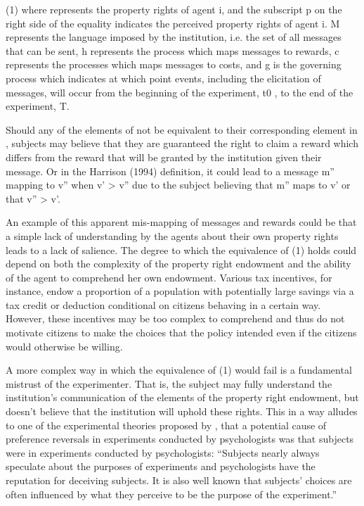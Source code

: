 \documentclass[../main.tex]{subfiles}
\begin{document}
(1)	  
where  represents the property rights of agent i, and the subscript p on the right side of the equality indicates the perceived property rights of agent i.
M represents the language imposed by the institution, i.e. the set of all messages that can be sent, h represents the process which maps messages to rewards, c represents the processes which maps messages to costs, and g is the governing process which indicates at which point events, including the elicitation of messages, will occur from the beginning of the experiment, t0 , to the end of the experiment, T. 

Should any of the elements of  not be equivalent to their corresponding element in , subjects may believe that they are guaranteed the right to claim a reward which differs from the reward that will be granted by the institution given their message.
Or in the Harrison (1994)⁠ definition, it could lead to a message m'' mapping to v'' when v' > v'' due to the subject believing that m'' maps to v' or that v'' > v'.

An example of this apparent mis-mapping of messages and rewards could be that a simple lack of understanding by the agents about their own property rights leads to a lack of salience.
The degree to which the equivalence of (1) holds could depend on both the complexity of the property right endowment and the ability of the agent to comprehend her own endowment.
Various tax incentives, for instance, endow a proportion of a population with potentially large savings via a tax credit or deduction conditional on citizens behaving in a certain way.
However, these incentives may be too complex to comprehend and thus do not motivate citizens to make the choices that the policy intended even if the citizens would otherwise be willing.

A more complex way in which the equivalence of (1) would fail is a fundamental mistrust of the experimenter.
That is, the subject may fully understand the institution's communication of the  elements of the property right endowment, but doesn't believe that the institution will uphold these rights.
This in a way alludes to one of the experimental theories proposed by \textcite[629]{Grether1979}, that a potential cause of preference reversals in experiments conducted by psychologists was that subjects were in experiments conducted by psychologists: 
\enquote{Subjects nearly always speculate about the purposes of experiments and psychologists have the reputation for deceiving subjects.
It is also well known that subjects' choices are often influenced by what they perceive to be the purpose of the experiment.} 
\end{document}
